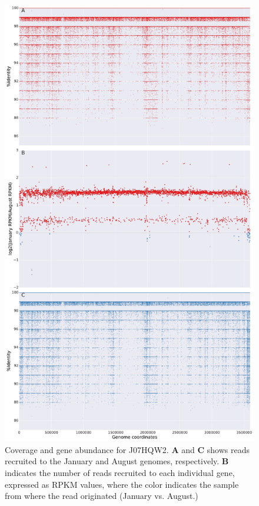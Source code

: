 \begin{figure}[!hbtp]
  \centering
  \includegraphics[width=\textwidth,height=0.8\textheight,keepaspectratio]{Chapter5/Figures/coverage_plots/J07HWQ2_coverage.pdf}
  \caption{Coverage and gene abundance for J07HQW2. \textbf{A} and \textbf{C} shows reads recruited to the January and August genomes, respectively. \textbf{B} indicates the number of reads recruited to each individual gene, expressed as RPKM values, where the color indicates the sample from where the read originated (January vs. August.)}
  \label{J07HWQ2coverage}
\end{figure}

